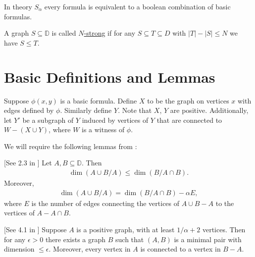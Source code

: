 \documentclass{amsart}
\newcommand{\defn}{\underline}
\newcommand{\DB}{\mathbb D}
\newcommand{\B}{B}
\newcommand{\X}{X}
\newcommand{\Y}{Y}
\begin{document}
\begin{Theorem} 
  In theory $S_\alpha$ every formula is equivalent to a boolean combination of basic formulas.
\end{Theorem}

\begin{Definition}
  A graph $S \subseteq \DB$ is called \defn{$N$-strong} if for any $S \subseteq T \subseteq D$ with $|T| - |S| \leq N$ we have $S \leq T$.
\end{Definition}

\section{Basic Definitions and Lemmas}

\begin{Definition} \label{def_basic}
  Suppose $\phi(x, y)$ is a basic formula.
  Define $\X$ to be the graph on vertices $x$ with edges defined by $\phi$.
  Similarly define $\Y$.
  Note that $\X$, $\Y$ are positive.
  Additionally, let $\Y'$ be a subgraph of $\Y$ induced by vertices of $\Y$ that are connected to $W - (X \cup Y)$, where $W$ is a witness of $\phi$.
\end{Definition}

We will require the following lemmas from \cite{laskowski}:

\begin{Lemma} \label{diamond} [See 2.3 in \cite{laskowski}]
  Let $A, B \subseteq \DB$.
  Then
  \begin{align*}
    \dim(A \cup B / A) \leq \dim(\B / A \cap B).
  \end{align*}
  Moreover, 
  \begin{align*}
    \dim(A \cup B / A) = \dim(\B / A \cap B) - \alpha E,
  \end{align*}
  where $E$ is the number of edges connecting the vertices of $A \cup B - A$ to the vertices of $A - A \cap B$.
\end{Lemma}

\begin{Lemma} \label{las_min} [See 4.1 in \cite{laskowski}]
  Suppose $A$ is a positive graph, with at least $1/\alpha + 2$ vertices.
  Then for any $\epsilon > 0$ there exists a graph $B$ such that $(A, B)$ is a minimal pair with dimension $\leq \epsilon$.
  Moreover, every vertex in $A$ is connected to a vertex in $B - A$.
\end{Lemma}
\end{document}

